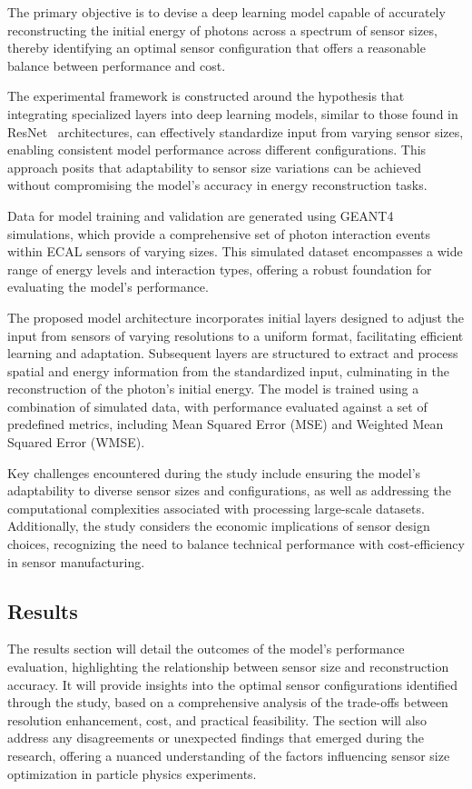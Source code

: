\documentclass[conference]{IEEEtran}
\begin{document}
The primary objective is to devise a deep learning model capable of accurately reconstructing the initial energy of photons across a spectrum of sensor sizes, thereby identifying an optimal sensor configuration that offers a reasonable balance between performance and cost.

The experimental framework is constructed around the hypothesis that integrating specialized layers into deep learning models, similar to those found in ResNet~\cite{he2015deep} architectures, can effectively standardize input from varying sensor sizes, enabling consistent model performance across different configurations. This approach posits that adaptability to sensor size variations can be achieved without compromising the model's accuracy in energy reconstruction tasks.

Data for model training and validation are generated using GEANT4~\cite{AGOSTINELLI2003250} simulations, which provide a comprehensive set of photon interaction events within ECAL sensors of varying sizes. This simulated dataset encompasses a wide range of energy levels and interaction types, offering a robust foundation for evaluating the model's performance.

The proposed model architecture incorporates initial layers designed to adjust the input from sensors of varying resolutions to a uniform format, facilitating efficient learning and adaptation. Subsequent layers are structured to extract and process spatial and energy information from the standardized input, culminating in the reconstruction of the photon's initial energy. The model is trained using a combination of simulated data, with performance evaluated against a set of predefined metrics, including Mean Squared Error (MSE) and Weighted Mean Squared Error (WMSE).

Key challenges encountered during the study include ensuring the model's adaptability to diverse sensor sizes and configurations, as well as addressing the computational complexities associated with processing large-scale datasets. Additionally, the study considers the economic implications of sensor design choices, recognizing the need to balance technical performance with cost-efficiency in sensor manufacturing.

\subsection{Results}
\label{main_body:results}

The results section will detail the outcomes of the model's performance evaluation, highlighting the relationship between sensor size and reconstruction accuracy. It will provide insights into the optimal sensor configurations identified through the study, based on a comprehensive analysis of the trade-offs between resolution enhancement, cost, and practical feasibility. The section will also address any disagreements or unexpected findings that emerged during the research, offering a nuanced understanding of the factors influencing sensor size optimization in particle physics experiments.
\end{document}
